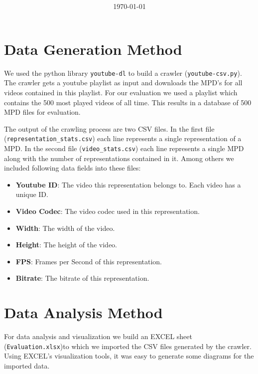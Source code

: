 \documentclass[paper=a4, fontsize=11pt]{scrartcl} %
\title{
\normalfont \normalsize
\huge \titlename\\ %
\horrule{0.2pt} %
}
\author{\authorname} %
\date{\normalsize\today} %
\providecommand{\tightlist}{%
  \setlength{\itemsep}{0pt}\setlength{\parskip}{0pt}}
\numberwithin{equation}{section} %
\numberwithin{figure}{section} %
\numberwithin{table}{section} %
\begin{document}
\maketitle %
\lstset{style=base}

\section{Data Generation Method}\label{data-generation-method}

We used the python library \texttt{youtube-dl} to build a crawler
(\texttt{youtube-csv.py}). The crawler gets a youtube playlist as input
and downloads the MPD's for all videos contained in this playlist. For
our evaluation we used a playlist which contains the 500 most played
videos of all time. This results in a database of 500 MPD files for
evaluation.

The output of the crawling process are two CSV files. In the first file
(\texttt{representation\_stats.csv}) each line represents a single
representation of a MPD. In the second file (\texttt{video\_stats.csv})
each line represents a single MPD along with the number of
representations contained in it. Among others we included following data
fields into these files:

\begin{itemize}
\tightlist
\item
  \textbf{Youtube ID}: The video this representation belongs to. Each
  video has a unique ID.
\item
  \textbf{Video Codec}: The video codec used in this representation.
\item
  \textbf{Width}: The width of the video.
\item
  \textbf{Height}: The height of the video.
\item
  \textbf{FPS}: Frames per Second of this representation.
\item
  \textbf{Bitrate}: The bitrate of this representation.
\end{itemize}

\section{Data Analysis Method}\label{data-analysis-method}

For data analysis and visualization we build an EXCEL sheet
(\texttt{Evaluation.xlsx})to which we imported the CSV files generated
by the crawler. Using EXCEL's visualization tools, it was easy to
generate some diagrams for the imported data.
\end{document}
